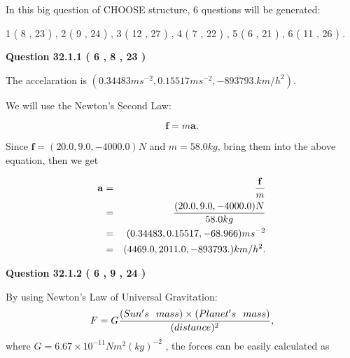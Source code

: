 \documentclass[12pt]{article}
\begin{document}
   
\vspace{0.2in}
   
 In this big question of CHOOSE structure,            6  questions will be generated: 
  
  
             1 (           8 ,          23 )
 ,
             2 (           9 ,          24 )
 ,
             3 (          12 ,          27 )
 ,
             4 (           7 ,          22 )
 ,
             5 (           6 ,          21 )
 ,
             6 (          11 ,          26 )
 .
  
\vspace{0.2in}
  
{\textbf{\Large{Question
32.1.1 
 (           6 ,           8 ,          23 )
}}}
  
  
 
 
\noindent{}
 
 
The accelaration is
$(
0.34483ms^{-2},
0.15517ms^{-2},
-893793.km/h^2
).
$
 
 
 
 
 
 
\noindent{}

We will use the Newton's Second Law:
 
\[
\mathbf{f}=m\mathbf{a}.
\]
 
Since $\mathbf{f}=( %
20.0,  %
9.0,  %
-4000.0 )N$
and $m= %
58.0kg$, bring them into the above equation, then we get
 
\begin{eqnarray*}
\mathbf{a}&=&\frac{\mathbf{f}}m  \\
&=&\frac{(
20.0 ,
9.0 ,
-4000.0 )N
}{ %
58.0 kg}  \\
&=&(
0.34483 ,
0.15517,
-68.966
)ms^{-2} \\
&=&(
4469.0 ,
2011.0 ,
-893793.
)km/h^2.
\end{eqnarray*}
 
 
 
  
\vspace{0.2in}
  
{\textbf{\Large{Question
32.1.2 
 (           6 ,           9 ,          24 )
}}}
  
  
 
 
\noindent{}

By using Newton's Law of Universal Gravitation:
\[
F=G \frac{(Sun's \hspace{0.1in} mass) \times (Planet's \hspace{0.1in} mass)} { (distance)^2},
\]
where
$ G= %
6.67 \times 10^{-11}N m^{2}(kg)^{-2}$ , the forces can be easily calculated as
 
\end{document}
